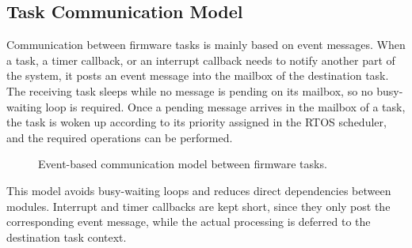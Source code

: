 \subsection{Task Communication Model}

Communication between firmware tasks is mainly based on event messages. When a task, a timer callback, or an interrupt callback needs to notify another part of the system, it posts an event message into the mailbox of the destination task. The receiving task sleeps while no message is pending on its mailbox, so no busy-waiting loop is required. Once a pending message arrives in the mailbox of a task, the task is woken up according to its priority assigned in the RTOS scheduler, and the required operations can be performed.

\begin{figure}[H]
	\centering
	\caption{Event-based communication model between firmware tasks.}
	\label{fig:task_communication_model}
	
\end{figure}

This model avoids busy-waiting loops and reduces direct dependencies between modules. Interrupt and timer callbacks are kept short, since they only post the corresponding event message, while the actual processing is deferred to the destination task context.

